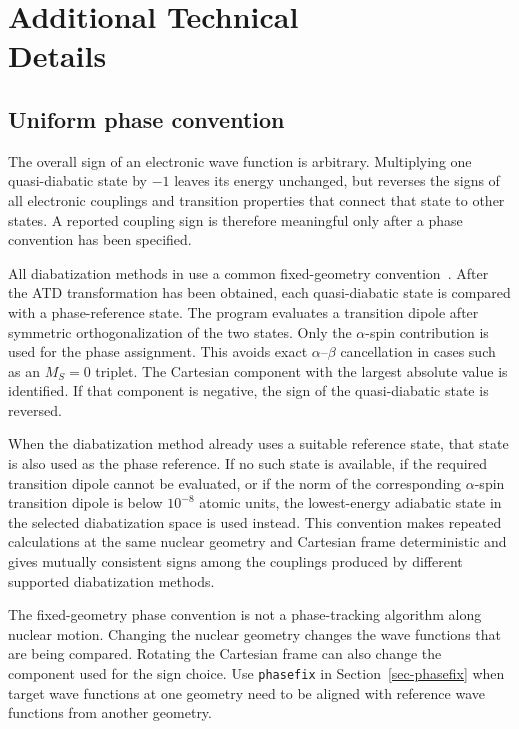 \chapter[Additional Technical Details]{Additional Technical\\Details}\label{app-phase}
\section{Uniform phase convention}
The overall sign of an electronic wave function is arbitrary. Multiplying one quasi-diabatic state by \(-1\) leaves its energy unchanged, but reverses the signs of all electronic couplings and transition properties that connect that state to other states. A reported coupling sign is therefore meaningful only after a phase convention has been specified.

All diabatization methods in \progname{} use a common fixed-geometry convention~\cite{Diabat2026}. After the ATD transformation has been obtained, each quasi-diabatic state is compared with a phase-reference state. The program evaluates a transition dipole after symmetric orthogonalization of the two states. Only the $\alpha$-spin contribution is used for the phase assignment. This avoids exact $\alpha$--$\beta$ cancellation in cases such as an \(M_S=0\) triplet. The Cartesian component with the largest absolute value is identified. If that component is negative, the sign of the quasi-diabatic state is reversed.

When the diabatization method already uses a suitable reference state, that state is also used as the phase reference. If no such state is available, if the required transition dipole cannot be evaluated, or if the norm of the corresponding $\alpha$-spin transition dipole is below \(10^{-8}\) atomic units, the lowest-energy adiabatic state in the selected diabatization space is used instead. This convention makes repeated calculations at the same nuclear geometry and Cartesian frame deterministic and gives mutually consistent signs among the couplings produced by different supported diabatization methods.

The fixed-geometry phase convention is not a phase-tracking algorithm along nuclear motion. Changing the nuclear geometry changes the wave functions that are being compared. Rotating the Cartesian frame can also change the component used for the sign choice. Use \texttt{phasefix} in Section~\ref{sec-phasefix} when target wave functions at one geometry need to be aligned with reference wave functions from another geometry.

